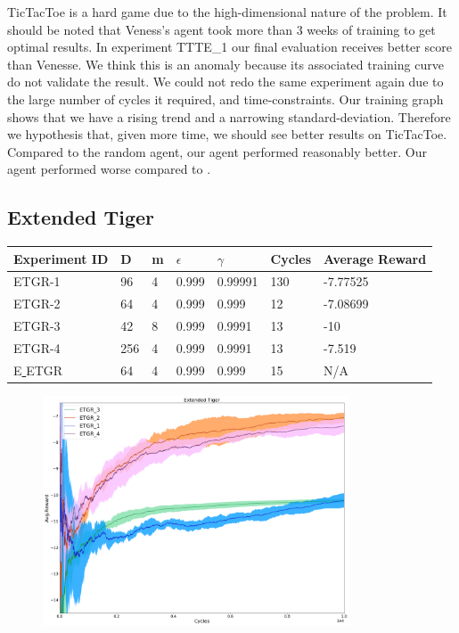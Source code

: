 \documentclass{article}
\theoremstyle{definition}
\newtheorem{primary statistics}[definition]{Primary Statistics}
\newtheorem{auxiliary statistics}[definition]{Auxiliary Statistics}
\begin{document}
TicTacToe is a hard game due to the high-dimensional nature of the problem. It should be noted that Veness’s agent took more than 3 weeks of training to get optimal results. In experiment TTTE\_1 our final evaluation receives better score than Venesse. We think this is an anomaly because its associated training curve do not validate the result. We could not redo the same experiment again due to the large number of cycles it required, and time-constraints. Our training graph shows that we have a rising trend and a narrowing standard-deviation. Therefore we hypothesis that, given more time, we should see better results on TicTacToe. Compared to the random agent, our agent performed reasonably better. Our agent performed worse compared to \cite{veness2011monte}.

\subsection{Extended Tiger}
 \begin{tabular}{|l|l|l|l|l|l|l|}
 \hline \centering
 Experiment ID& D & m & $\epsilon$ & $\gamma$ & Cycles & Average Reward \\ \hline
ETGR-1 & 96        & 4           & 0.999       & 0.99991           & 130    & -7.77525        \\ \hline
ETGR-2 & 64        & 4           & 0.999       & 0.999             & 12     & -7.08699       \\ \hline
ETGR-3 & 42        & 8           & 0.999       & 0.9991            & 13     & -10             \\ \hline
ETGR-4 & 256       & 4           & 0.999       & 0.9991            & 13     & -7.519  \\ \hline 
E\underline{ }ETGR & 64       & 4           & 0.999       & 0.999            & 15     & N/A  \\ \hline    
\end{tabular} 

 \begin{figure}[h]
 \centering
    \includegraphics[width=9.1cm]{4_Extended_Tiger}
\end{figure}
\end{document}

